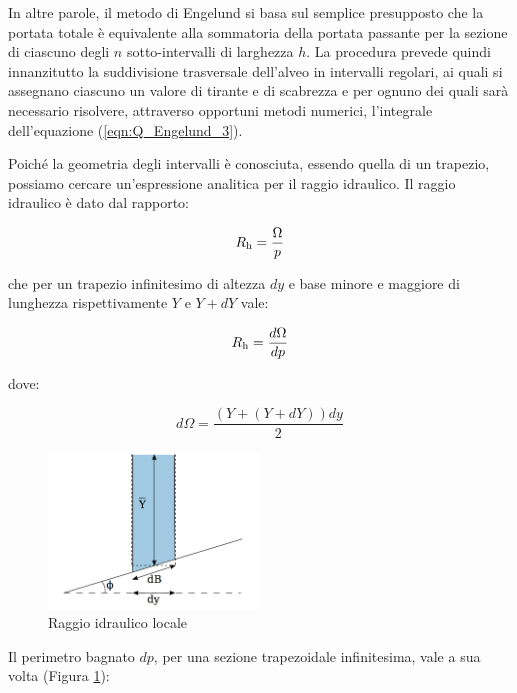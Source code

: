 \documentclass[12pt]{article} %
\begin{document}
\noindent In altre parole, il metodo di Engelund si basa sul semplice presupposto che la portata totale è equivalente alla sommatoria della portata passante per la sezione di ciascuno degli $n$ sotto-intervalli di larghezza $h$. La procedura prevede quindi innanzitutto la suddivisione trasversale dell’alveo in intervalli regolari, ai quali si assegnano ciascuno un valore di tirante e di scabrezza e per ognuno dei quali sarà necessario risolvere, attraverso opportuni metodi numerici, l’integrale dell’equazione (\ref{eqn:Q_Engelund_3}).

\noindent Poiché la geometria degli intervalli è conosciuta, essendo quella di un trapezio, possiamo cercare un’espressione analitica per il raggio idraulico. Il raggio idraulico è dato dal rapporto:

\begin{equation}
    R\textsubscript{h}=\frac{\Omega}{p}
    \label{eqn:Rh_1}
\end{equation}


\noindent che per un trapezio infinitesimo di altezza $dy$ e base minore e maggiore di lunghezza rispettivamente $Y$ e $Y+dY$ vale:

\begin{equation}
    R\textsubscript{h}=\frac{d\Omega}{dp}
    \label{eqn:Rh_2}
\end{equation}

\noindent dove:

\begin{equation}
    d\Omega=\frac{(Y+(Y+dY))dy}{2}
    \label{eqn:dOmega}
\end{equation}

\begin{figure}
    \centering
    \includegraphics[width=0.5\textwidth]{Rh locale.png}
    \caption{Raggio idraulico locale}
    \label{fig:Rh locale}
\end{figure}

\noindent Il perimetro bagnato $dp$, per una sezione trapezoidale infinitesima, vale a sua volta (Figura \ref{fig:Rh locale}):
\end{document}
